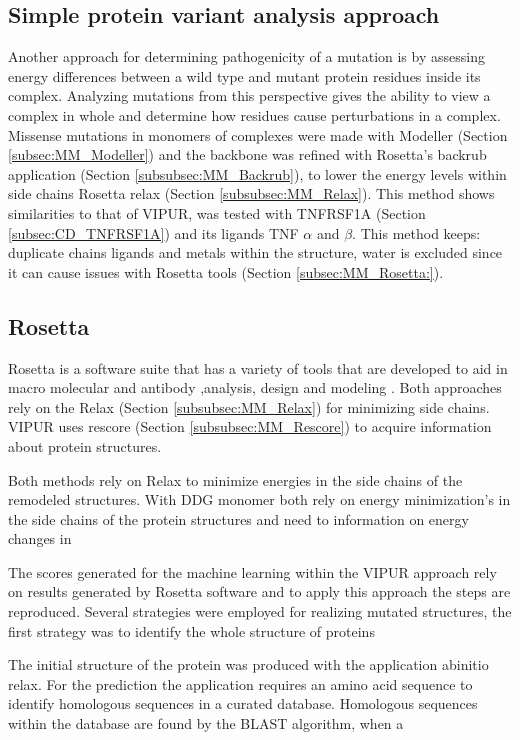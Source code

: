 \subsection{Simple protein variant analysis approach}
Another approach for determining pathogenicity of a mutation is by assessing energy differences between a wild type and mutant protein residues inside its complex. Analyzing mutations from this perspective gives the ability to view a complex in whole and determine how residues cause perturbations in a complex. Missense mutations in monomers of complexes were made with Modeller (Section \ref{subsec:MM_Modeller}) and the backbone was refined with Rosetta's backrub application (Section \ref{subsubsec:MM_Backrub}), to lower the energy levels within side chains Rosetta relax (Section \ref{subsubsec:MM_Relax}). This method shows similarities to that of VIPUR,  was tested with TNFRSF1A (Section \ref{subsec:CD_TNFRSF1A}) and its ligands TNF $\alpha$ and $\beta$. This method keeps: duplicate chains ligands and metals within the structure, water is excluded since it can cause issues with Rosetta tools (Section \ref{subsec:MM_Rosetta:}).
\label{}

\subsection{Rosetta}
Rosetta is a software suite that has a variety of tools that are developed to aid in macro molecular and antibody ,analysis, design and modeling \cite{}.
Both approaches rely on the Relax (Section \ref{subsubsec:MM_Relax}) for minimizing side chains. VIPUR uses rescore (Section \ref{subsubsec:MM_Rescore}) to acquire information about protein structures.

Both methods rely on Relax  to minimize energies in the side chains of the remodeled structures. With  DDG monomer  both rely on energy minimization's  in the side chains of the protein structures and need to information on energy changes in 

The scores generated for the machine learning within the VIPUR approach rely on results generated by Rosetta software and to apply this approach the steps are reproduced.  
Several strategies were employed for realizing mutated structures, the first strategy was to identify the whole structure of proteins


 The initial structure of the protein was produced with the application abinitio relax. For the prediction the application requires an amino acid sequence to identify homologous sequences in a curated database. Homologous sequences within the database are found by the BLAST algorithm, when a

